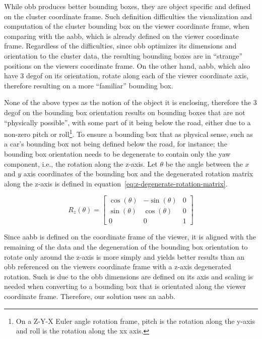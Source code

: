 While \ac{obb} produces better bounding boxes, they are object specific and defined on the cluster coordinate frame. Such definition difficulties the visualization and computation of the cluster bounding box on the viewer coordinate frame, when comparing with the \ac{aabb}, which is already defined on the viewer coordinate frame.  Regardless of the difficulties, since \ac{obb} optimizes its dimensions and orientation to the cluster data, the resulting bounding boxes are in ``strange'' positions on the viewers coordinate frame. On the other hand, \ac{aabb}, which also have 3 \ac{degof} on its orientation, rotate along each of the viewer coordinate axis, therefore resulting on a more ``familiar'' bounding box.

None of the above types as the notion of the object it is enclosing, therefore the 3 \ac{degof} on the bounding box orientation results on bounding boxes that are not ``physically possible'', with some part of it being below the road, either due to a non-zero pitch or roll\footnote{On a Z-Y-X Euler angle rotation frame, pitch is the rotation along the y-axis and roll is the rotation along the xx axis.}. To ensure a bounding box that as physical sense, such as a car's bounding box not being defined below the road, for instance; the bounding box orientation needs to be degenerate to contain only the yaw component, i.e., the rotation along the z-axis. Let $\theta$ be the angle between the $x$ and $y$ axis coordinates of the bounding box and the degenerated rotation matrix along the z-axis is defined in equation~\ref{eq:z-degenerate-rotation-matrix}.

\begin{equation}
	\label{eq:z-degenerate-rotation-matrix}
	R_z(\theta) = 
	\begin{bmatrix}
		\cos(\theta) & -\sin(\theta) & 0 \\
		\sin(\theta) & \cos(\theta) & 0 \\
		0 & 0 & 1
	\end{bmatrix}
\end{equation}

Since \ac{aabb} is defined on the coordinate frame of the viewer, it is aligned with the remaining of the data and the degeneration of the bounding box orientation to rotate only around the z-axis is more simply and yields better results than an \ac{obb} referenced on the viewers coordinate frame with a z-axis degenerated rotation. Such is due to the \ac{obb} dimensions are defined on its axis and scaling is needed when converting to a bounding box that is orientated along the viewer coordinate frame. Therefore, our solution uses an \acf{aabb}.

